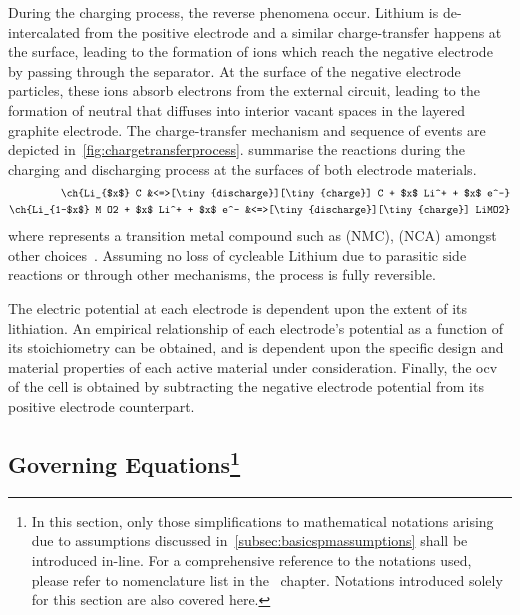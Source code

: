 During  the   charging  process,  the   reverse  phenomena  occur.   Lithium  is
de-intercalated  from  the  positive  electrode and  a  similar  charge-transfer
happens  at the  surface,  leading  to the  formation  of   ions  which
reach  the  negative  electrode  by   passing  through  the  separator.  At  the
surface  of  the  negative  electrode particles,  these  ions  absorb  electrons
from  the  external circuit,  leading  to  the  formation of  neutral  
that   diffuses  into   interior   vacant  spaces   in   the  layered   graphite
electrode. The  charge-transfer mechanism  and sequence  of events  are depicted
in~\cref{fig:chargetransferprocess}.
 summarise the reactions during the
charging and discharging process at the surfaces of both electrode materials.
\tikzexternaldisable
\begin{align}
    \ch{Li_{$x$} C                            &<=>[\tiny{discharge}][\tiny{charge}] C + $x$ Li^+ + $x$ e^-}\label{eq:NegElectrodeRxn}\\
    \ch{Li_{1-$x$} M O2 + $x$ Li^+  + $x$ e^- &<=>[\tiny{discharge}][\tiny{charge}] LiMO2}\label{eq:PosElectrodeRxn}
\end{align}
\tikzexternalenable
where       represents    a    transition   metal    compound   such    as
   (NMC),      (NCA)
amongst other  choices~\cite{Reddy2011}. Assuming  no loss of  cycleable Lithium
due to  parasitic side  reactions or  through other  mechanisms, the  process is
fully reversible.


The  electric potential  at  each  electrode is  dependent  upon  the extent  of
its  lithiation. An  empirical  relationship of  each  electrode's potential  as
a  function  of  its  stoichiometry  can be  obtained,  and  is  dependent  upon
the  specific design  and  material  properties of  each  active material  under
consideration. Finally, the \gls{ocv} of the cell is obtained by subtracting the
negative electrode potential from its positive electrode counterpart.

\subsection[Governing  Equations]{Governing  Equations\protect\footnote{In  this
section,   only  those   simplifications  to   mathematical  notations   arising
due  to  assumptions  discussed  in~\cref{subsec:basicspmassumptions}  shall  be
introduced   in-line.   For  a   comprehensive   reference   to  the   notations
used,   please  refer   to   nomenclature   list  in   the~
chapter.  Notations  introduced  solely  for   this  section  are  also  covered
here.}}\label{subsec:basicspmgoverningeqns}


